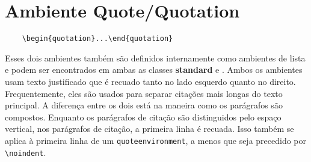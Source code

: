 \chapter{Ambiente Quote/Quotation}
\begin{verbatim}
    \begin{quotation}...\end{quotation}  
\end{verbatim}
Esses dois ambientes também são definidos internamente como ambientes de lista e podem ser encontrados em ambas as classes \textbf{standard} e \KOMAScript. Ambos os ambientes usam texto justificado que é recuado tanto no lado esquerdo quanto no direito. Frequentemente, eles são usados para separar citações mais longas do texto principal. A diferença entre os dois está na maneira como os parágrafos são compostos. Enquanto os parágrafos de citação são distinguidos pelo espaço vertical, nos parágrafos de citação, a primeira linha é recuada. Isso também se aplica à primeira linha de um \texttt{quo\-te\-en\-vi\-ron\-ment}, a menos que seja precedido por \verb|\noindent|.
